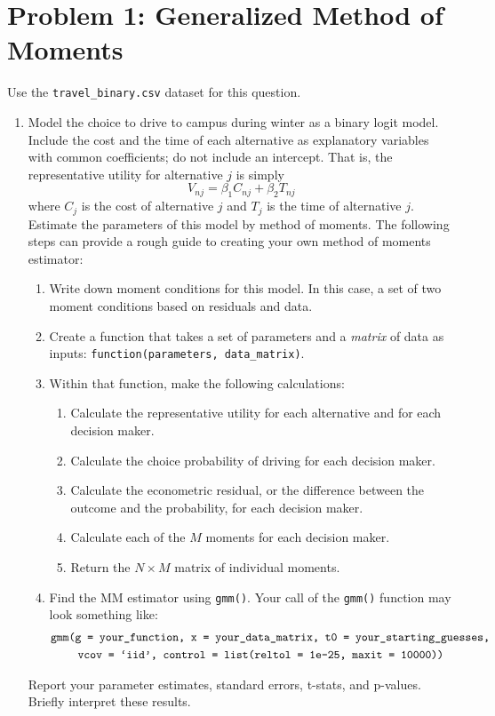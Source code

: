 \documentclass[11pt,letterpaper]{article}
\begin{document}
\section*{Problem 1: Generalized Method of Moments}

Use the \texttt{travel\_binary.csv} dataset for this question.

\begin{enumerate}[label=\alph*., leftmargin=*]
	\item Model the choice to drive to campus during winter as a binary logit model. Include the cost and the time of each alternative as explanatory variables with common coefficients; do not include an intercept. That is, the representative utility for alternative $j$ is simply
	$$V_{nj} = \beta_1 C_{nj} + \beta_2 T_{nj}$$
	where $C_j$ is the cost of alternative $j$ and $T_j$ is the time of alternative $j$. Estimate the parameters of this model by method of moments. The following steps can provide a rough guide to creating your own method of moments estimator:
	\begin{enumerate}[label=\Roman*.]
		\item Write down moment conditions for this model. In this case, a set of two moment conditions based on residuals and data.
		\item Create a function that takes a set of parameters and a \emph{matrix} of data as inputs: \texttt{function(parameters, data\_matrix)}.
		\item Within that function, make the following calculations:
		\begin{enumerate}[label=\roman*.]
			\item Calculate the representative utility for each alternative and for each decision maker.
			\item Calculate the choice probability of driving for each decision maker.
			\item Calculate the econometric residual, or the difference between the outcome and the probability, for each decision maker.
			\item Calculate each of the $M$ moments for each decision maker.
			\item Return the $N \times M$ matrix of individual moments.
		\end{enumerate}
		\item Find the MM estimator using \texttt{gmm()}. Your call of the \texttt{gmm()} function may look something like:
		\begin{align*}
			&\text{\texttt{gmm(g = your\_function, x = your\_data\_matrix, t0 = your\_starting\_guesses, }} \\
			&\qquad~ \text{\texttt{vcov = `iid', control = list(reltol = 1e-25, maxit = 10000))}}
		\end{align*}
	\end{enumerate}
	Report your parameter estimates, standard errors, t-stats, and p-values. Briefly interpret these results.


\end{enumerate}
\end{document}
